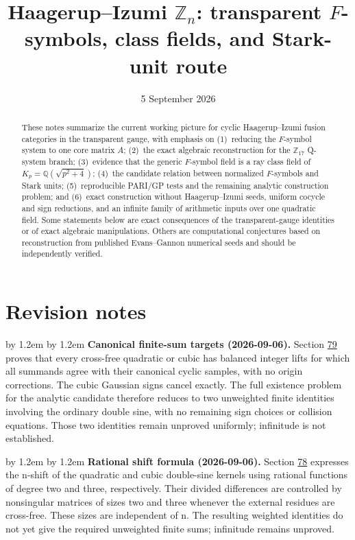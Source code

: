 \documentclass[11pt,reqno]{amsart}
\theoremstyle{plain}
\newenvironment{revnote}%
  {\par\addvspace{0.7\baselineskip}\begingroup\small
   \advance\leftskip by 1.2em \advance\rightskip by 1.2em \noindent\ignorespaces}%
  {\par\endgroup\addvspace{0.7\baselineskip}}
\begin{document}
\title[Haagerup--Izumi class fields and Stark units]{Haagerup--Izumi \(\mathbb Z_n\): transparent \(F\)-symbols, class fields, and Stark-unit route}
\date{5 September 2026}

\begin{abstract}
These notes summarize the current working picture for cyclic
Haagerup--Izumi fusion categories in the transparent gauge, with emphasis on
(1)~reducing the \(F\)-symbol system to one core matrix \(A\);
(2)~the exact algebraic reconstruction for the \(\mathbb Z_{17}\) Q-system branch;
(3)~evidence that the generic \(F\)-symbol field is a ray class field of
\(K_p=\mathbb Q\!\left(\sqrt{p^2+4}\right)\);
(4)~the candidate relation between normalized \(F\)-symbols and Stark units;
(5)~reproducible PARI/GP tests and the remaining analytic construction problem;
and (6)~exact construction without Haagerup--Izumi seeds, uniform cocycle and
sign reductions, and an infinite family of arithmetic inputs over one quadratic
field.  Some statements below are exact consequences of the transparent-gauge
identities or of exact algebraic manipulations.  Others are computational
conjectures based on reconstruction from published Evans--Gannon numerical
seeds and should be independently verified.
\end{abstract}

\maketitle

\tableofcontents

\section*{Revision notes}

\begin{revnote}
\textbf{Canonical finite-sum targets (2026-09-06).} Section \hyperref[sec:79]{79} proves that every cross-free quadratic or cubic has balanced integer lifts for which all summands agree with their canonical cyclic samples, with no origin corrections. The cubic Gaussian signs cancel exactly. The full existence problem for the analytic candidate therefore reduces to two unweighted finite identities involving the ordinary double sine, with no remaining sign choices or collision equations. Those two identities remain unproved uniformly; infinitude is not established.
\end{revnote}

\begin{revnote}
\textbf{Rational shift formula (2026-09-06).} Section \hyperref[sec:78]{78} expresses the n-shift of the quadratic and cubic double-sine kernels using rational functions of degree two and three, respectively. Their divided differences are controlled by nonsingular matrices of sizes two and three whenever the external residues are cross-free. These sizes are independent of n. The resulting weighted identities do not yet give the required unweighted finite sums; infinitude remains unproved.
\end{revnote}
\end{document}
